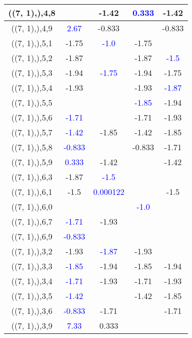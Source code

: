 \documentclass{article}
\begin{document}
\begin{center}
\begin{longtable}{|c|c|c|c|c|}
        	\hline
        	((7, 1),),4,8&&-1.42& \textcolor{blue}{0.333}&-1.42\\
        	\hline
        	((7, 1),),4,9& \textcolor{blue}{2.67}&-0.833&&-0.833\\
        	\hline
        	((7, 1),),5,1&-1.75& \textcolor{blue}{-1.0}&-1.75&\\
        	\hline
        	((7, 1),),5,2&-1.87&&-1.87& \textcolor{blue}{-1.5}\\
        	\hline
        	((7, 1),),5,3&-1.94& \textcolor{blue}{-1.75}&-1.94&-1.75\\
        	\hline
        	((7, 1),),5,4&-1.93&&-1.93& \textcolor{blue}{-1.87}\\
        	\hline
        	((7, 1),),5,5&&& \textcolor{blue}{-1.85}&-1.94\\
        	\hline
        	((7, 1),),5,6& \textcolor{blue}{-1.71}&&-1.71&-1.93\\
        	\hline
        	((7, 1),),5,7& \textcolor{blue}{-1.42}&-1.85&-1.42&-1.85\\
        	\hline
        	((7, 1),),5,8& \textcolor{blue}{-0.833}&&-0.833&-1.71\\
        	\hline
        	((7, 1),),5,9& \textcolor{blue}{0.333}&-1.42&&-1.42\\
        	\hline
        	((7, 1),),6,3&-1.87& \textcolor{blue}{-1.5}&&\\
        	\hline
        	((7, 1),),6,1&-1.5& \textcolor{blue}{0.000122}&&-1.5\\
        	\hline
        	((7, 1),),6,0&&& \textcolor{blue}{-1.0}&\\
        	\hline
        	((7, 1),),6,7& \textcolor{blue}{-1.71}&-1.93&&\\
        	\hline
        	((7, 1),),6,9& \textcolor{blue}{-0.833}&&&\\
        	\hline
        	((7, 1),),3,2&-1.93& \textcolor{blue}{-1.87}&-1.93&\\
        	\hline
        	((7, 1),),3,3& \textcolor{blue}{-1.85}&-1.94&-1.85&-1.94\\
        	\hline
        	((7, 1),),3,4& \textcolor{blue}{-1.71}&-1.93&-1.71&-1.93\\
        	\hline
        	((7, 1),),3,5& \textcolor{blue}{-1.42}&&-1.42&-1.85\\
        	\hline
        	((7, 1),),3,6& \textcolor{blue}{-0.833}&-1.71&&-1.71\\
        	\hline
        	((7, 1),),3,9& \textcolor{blue}{7.33}&0.333&&\\
        	\hline

\end{longtable}
\end{center}
\end{document}
